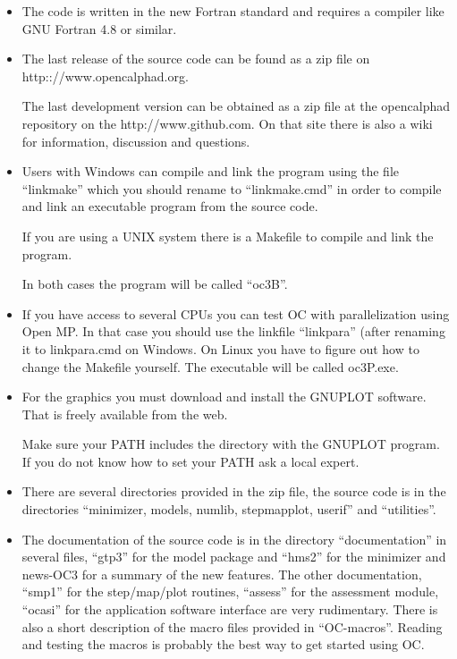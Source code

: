 \documentclass[12pt]{article}
\begin{document}
\begin{itemize}
\item The code is written in the new Fortran standard and requires a
  compiler like GNU Fortran 4.8 or similar.

\item The last release of the source code can be found as a zip file
  on http:://www.opencalphad.org.

  The last development version can be obtained as a zip file at the
  opencalphad repository on the http://www.github.com.  On that site
  there is also a wiki for information, discussion and questions.

\item Users with Windows can compile and link the program using the
  file ``linkmake'' which you should rename to ``linkmake.cmd'' in
  order to compile and link an executable program from the source
  code.

  If you are using a UNIX system there is a Makefile to compile and link
  the program.

  In both cases the program will be called ``oc3B''.

\item If you have access to several CPUs you can test OC with
  parallelization using Open MP.  In that case you should use the
  linkfile ``linkpara'' (after renaming it to linkpara.cmd on
  Windows.  On Linux you have to figure out how to change the Makefile
  yourself.  The executable will be called oc3P.exe.

\item For the graphics you must download and install the GNUPLOT
  software.  That is freely available from the web.

  Make sure your PATH includes the directory with the GNUPLOT program.
  If you do not know how to set your PATH ask a local expert.

\item There are several directories provided in the zip file, the
  source code is in the directories ``minimizer, models, numlib,
  stepmapplot, userif'' and ``utilities''.

\item The documentation of the source code is in the directory
  ``documentation'' in several files, ``gtp3'' for the model package
  and ``hms2'' for the minimizer and news-OC3 for a summary of the new
  features.  The other documentation, ``smp1'' for the step/map/plot
  routines, ``assess'' for the assessment module, ``ocasi'' for the
  application software interface are very rudimentary.  There is also
  a short description of the macro files provided in ``OC-macros''.
  Reading and testing the macros is probably the best way to get
  started using OC.


\end{itemize}
\end{document}
